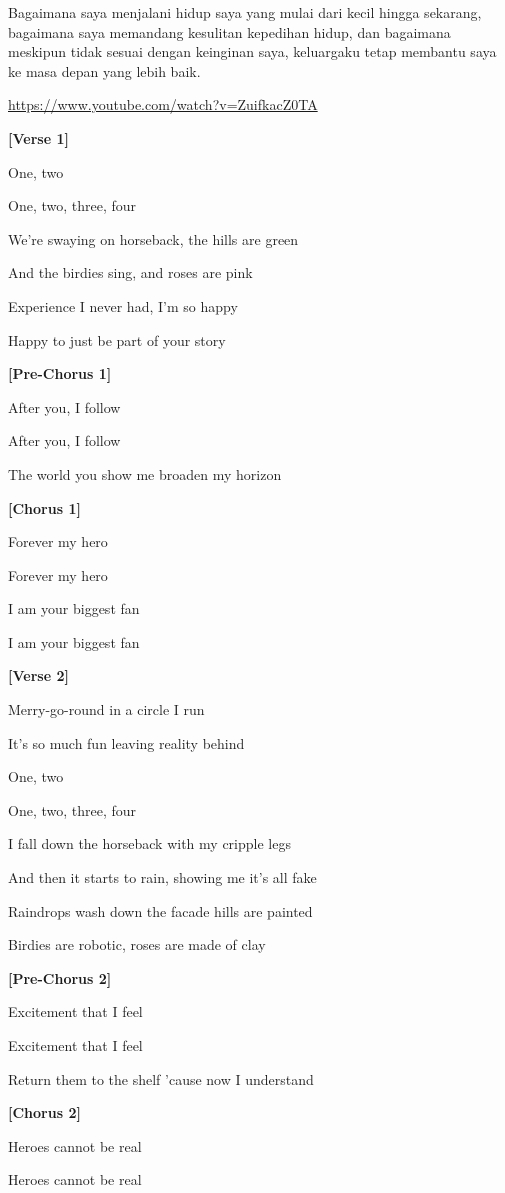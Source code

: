 \documentclass[
  letterpaper,
  DIV=11,
  numbers=noendperiod]{scrreprt}
\begin{document}
Bagaimana saya menjalani hidup saya yang mulai dari kecil hingga
sekarang, bagaimana saya memandang kesulitan kepedihan hidup, dan
bagaimana meskipun tidak sesuai dengan keinginan saya, keluargaku tetap
membantu saya ke masa depan yang lebih baik.

\url{https://www.youtube.com/watch?v=ZuifkacZ0TA}

\textbf{{[}Verse 1{]}}

One, two

One, two, three, four

We're swaying on horseback, the hills are green

And the birdies sing, and roses are pink

Experience I never had, I'm so happy

Happy to just be part of your story

\textbf{{[}Pre-Chorus 1{]}}

After you, I follow

After you, I follow

The world you show me broaden my horizon

\textbf{{[}Chorus 1{]}}

Forever my hero

Forever my hero

I am your biggest fan

I am your biggest fan

\textbf{{[}Verse 2{]}}

Merry-go-round in a circle I run

It's so much fun leaving reality behind

One, two

One, two, three, four

I fall down the horseback with my cripple legs

And then it starts to rain, showing me it's all fake

Raindrops wash down the facade hills are painted

Birdies are robotic, roses are made of clay

\textbf{{[}Pre-Chorus 2{]}}

Excitement that I feel

Excitement that I feel

Return them to the shelf 'cause now I understand

\textbf{{[}Chorus 2{]}}

Heroes cannot be real

Heroes cannot be real
\end{document}
